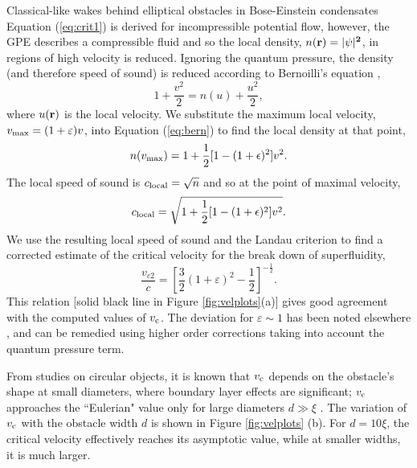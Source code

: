 \begin{chapter}{\label{cha:wake}Classical-like wakes behind elliptical obstacles in Bose-Einstein condensates}
Equation (\ref{eq:crit1}) is derived for incompressible potential flow, however, the GPE describes a compressible fluid and so the local density, $n(\bf r) = |\psi|^2$, in regions of high velocity is reduced. Ignoring the quantum pressure, the density (and therefore speed of sound) is reduced according to Bernoilli's equation \cite{win01},
\begin{equation}
1+\frac{v^2}{2} = n(u)+\frac{u^2}{2},
\label{eq:bern}
\end{equation}
where $u(\bf r)$ is the local velocity. We substitute the maximum local velocity, $v_{\rm max}=(1+\varepsilon)v$, into Equation (\ref{eq:bern}) to find the local density at that point,
\begin{equation*}
n(v_{\rm max}) = 1+\frac{1}{2}[1-(1+\epsilon)^2]v^2.
\end{equation*}
The local speed of sound is $c_{\rm local}=\sqrt{n}$ and so at the point of maximal velocity,
\begin{equation*}
c_{\rm local} = \sqrt{1+\frac{1}{2}[1-(1+\epsilon)^2]v^2}.
\end{equation*}
We use the resulting local speed of sound and the Landau criterion to find a corrected estimate of the critical velocity for the break down of superfluidity, 
\begin{equation}
\frac{v_{c2}}{c} = \left [\frac{3}{2}(1+\varepsilon)^2 - \frac{1}{2}\right]^{-\frac{1}{2}}.
\label{eq:crit2}
\end{equation}
This relation [solid black line in Figure \ref{fig:velplots}(a)] gives good agreement with the computed values of $v_{\rm c}$.  The deviation for $\varepsilon \sim 1$ has been noted elsewhere \cite{rica2001}, and can be remedied using higher order corrections taking into account the quantum pressure term.

From studies on circular objects, it is known that $v_{\rm c}$ depends on the obstacle's shape at small diameters, where boundary layer effects are significant; $v_{\rm c}$ approaches the ``Eulerian" value only for large diameters $d \gg \xi$ \cite{huepe00,rica2001}.  The variation of $v_{\rm c}$ with the obstacle width $d$ is shown in Figure \ref{fig:velplots} (b).  For $d=10\xi$, the critical velocity effectively reaches its asymptotic value, while at smaller widths, it is much larger.   


\end{chapter}
